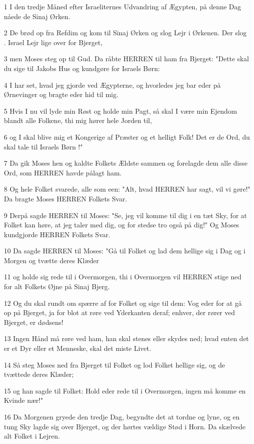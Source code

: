 \par 1 I den tredje Måned efter Israeliternes Udvandring af Ægypten, på denne Dag nåede de Sinaj Ørken.
\par 2 De brød op fra Refdim og kom til Sinaj Ørken og slog Lejr i Ørkenen. Der slog . Israel Lejr lige over for Bjerget,
\par 3 men Moses steg op til Gud. Da råbte HERREN til ham fra Bjerget: "Dette skal du sige til Jakobs Hus og kundgøre for Israels Børn:
\par 4 I har set, hvad jeg gjorde ved Ægypterne, og hvorledes jeg bar eder på Ørnevinger og bragte eder hid til mig.
\par 5 Hvis I nu vil lyde min Røst og holde min Pagt, så skal I være min Ejendom blandt alle Folkene, thi mig hører hele Jorden til,
\par 6 og I skal blive mig et Kongerige af Præster og et helligt Folk! Det er de Ord, du skal tale til Israels Børn !"
\par 7 Da gik Moses hen og kaldte Folkets Ældste sammen og forelagde dem alle disse Ord, som HERREN havde pålagt ham.
\par 8 Og hele Folket svarede, alle som een: "Alt, hvad HERREN har sagt, vil vi gøre!" Da bragte Moses HERREN Folkets Svar.
\par 9 Derpå sagde HERREN til Moses: "Se, jeg vil komme til dig i en tæt Sky, for at Folket kan høre, at jeg taler med dig, og for stedse tro også på dig!" Og Moses kundgjorde HERREN Folkets Svar.
\par 10 Da sagde HERREN til Moses: "Gå til Folket og lad dem hellige sig i Dag og i Morgen og tvætte deres Klæder
\par 11 og holde sig rede til i Overmorgen, thi i Overmorgen vil HERREN stige ned for alt Folkets Øjne på Sinaj Bjerg.
\par 12 Og du skal rundt om spærre af for Folket og sige til dem: Vog eder for at gå op på Bjerget, ja for blot at røre ved Yderkanten deraf; enhver, der rører ved Bjerget, er dødsens!
\par 13 Ingen Hånd må røre ved ham, han skal stenes eller skydes ned; hvad enten det er et Dyr eller et Menneske, skal det miste Livet.
\par 14 Så steg Moses ned fra Bjerget til Folket og lod Folket hellige sig, og de tvættede deres Klæder;
\par 15 og han sagde til Folket: Hold eder rede til i Overmorgen, ingen må komme en Kvinde nær!"
\par 16 Da Morgenen gryede den tredje Dag, begyndte det at tordne og lyne, og en tung Sky lagde sig over Bjerget, og der hørtes vældige Stød i Horn. Da skælvede alt Folket i Lejren.
